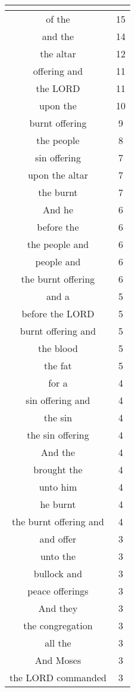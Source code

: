 \begin{center}
\begin{longtable}{|c|c|}
\hline \multicolumn{2}{c}{{ }} \\ \hline
\endfoot 
of the & 15\\ \hline 
and the & 14\\ \hline 
the altar & 12\\ \hline 
offering and & 11\\ \hline 
the LORD & 11\\ \hline 
upon the & 10\\ \hline 
burnt offering & 9\\ \hline 
the people & 8\\ \hline 
sin offering & 7\\ \hline 
upon the altar & 7\\ \hline 
the burnt & 7\\ \hline 
And he & 6\\ \hline 
before the & 6\\ \hline 
the people and & 6\\ \hline 
people and & 6\\ \hline 
the burnt offering & 6\\ \hline 
and a & 5\\ \hline 
before the LORD & 5\\ \hline 
burnt offering and & 5\\ \hline 
the blood & 5\\ \hline 
the fat & 5\\ \hline 
for a & 4\\ \hline 
sin offering and & 4\\ \hline 
the sin & 4\\ \hline 
the sin offering & 4\\ \hline 
And the & 4\\ \hline 
brought the & 4\\ \hline 
unto him & 4\\ \hline 
he burnt & 4\\ \hline 
the burnt offering and & 4\\ \hline 
and offer & 3\\ \hline 
unto the & 3\\ \hline 
bullock and & 3\\ \hline 
peace offerings & 3\\ \hline 
And they & 3\\ \hline 
the congregation & 3\\ \hline 
all the & 3\\ \hline 
And Moses & 3\\ \hline 
the LORD commanded & 3\\ \hline 

\end{longtable}
\end{center}
